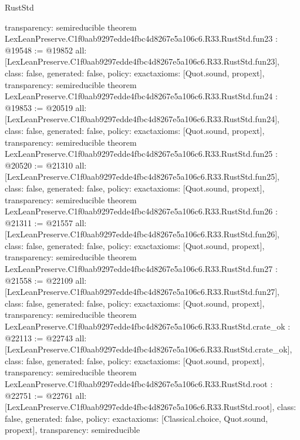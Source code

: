 \begin{lexlean}{RustStd}
\begin{coremodule}
{  transparency: semireducible
}
theorem LexLeanPreserve.C1f0aab9297edde4fbc4d8267e5a106c6.R33.RustStd.fun23 : @19548 := @19852 {
  all: [LexLeanPreserve.C1f0aab9297edde4fbc4d8267e5a106c6.R33.RustStd.fun23],
  class: false,
  generated: false,
  policy: exact{axioms: [Quot.sound, propext]},
  transparency: semireducible
}
theorem LexLeanPreserve.C1f0aab9297edde4fbc4d8267e5a106c6.R33.RustStd.fun24 : @19853 := @20519 {
  all: [LexLeanPreserve.C1f0aab9297edde4fbc4d8267e5a106c6.R33.RustStd.fun24],
  class: false,
  generated: false,
  policy: exact{axioms: [Quot.sound, propext]},
  transparency: semireducible
}
theorem LexLeanPreserve.C1f0aab9297edde4fbc4d8267e5a106c6.R33.RustStd.fun25 : @20520 := @21310 {
  all: [LexLeanPreserve.C1f0aab9297edde4fbc4d8267e5a106c6.R33.RustStd.fun25],
  class: false,
  generated: false,
  policy: exact{axioms: [Quot.sound, propext]},
  transparency: semireducible
}
theorem LexLeanPreserve.C1f0aab9297edde4fbc4d8267e5a106c6.R33.RustStd.fun26 : @21311 := @21557 {
  all: [LexLeanPreserve.C1f0aab9297edde4fbc4d8267e5a106c6.R33.RustStd.fun26],
  class: false,
  generated: false,
  policy: exact{axioms: [Quot.sound, propext]},
  transparency: semireducible
}
theorem LexLeanPreserve.C1f0aab9297edde4fbc4d8267e5a106c6.R33.RustStd.fun27 : @21558 := @22109 {
  all: [LexLeanPreserve.C1f0aab9297edde4fbc4d8267e5a106c6.R33.RustStd.fun27],
  class: false,
  generated: false,
  policy: exact{axioms: [Quot.sound, propext]},
  transparency: semireducible
}
theorem LexLeanPreserve.C1f0aab9297edde4fbc4d8267e5a106c6.R33.RustStd.crate_ok : @22113 := @22743 {
  all: [LexLeanPreserve.C1f0aab9297edde4fbc4d8267e5a106c6.R33.RustStd.crate_ok],
  class: false,
  generated: false,
  policy: exact{axioms: [Quot.sound, propext]},
  transparency: semireducible
}
theorem LexLeanPreserve.C1f0aab9297edde4fbc4d8267e5a106c6.R33.RustStd.root : @22751 := @22761 {
  all: [LexLeanPreserve.C1f0aab9297edde4fbc4d8267e5a106c6.R33.RustStd.root],
  class: false,
  generated: false,
  policy: exact{axioms: [Classical.choice, Quot.sound, propext]},
  transparency: semireducible
}


\end{coremodule}
\end{lexlean}
